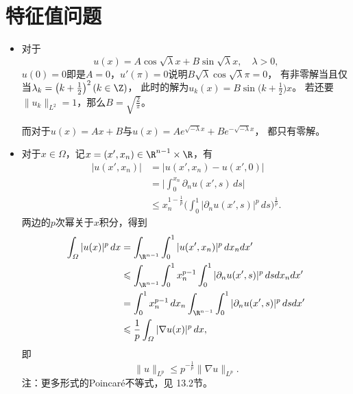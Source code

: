 \section{特征值问题}
\begin{itemize}
    \item[1.]
    对于\[u(x)=A\cos\sqrt{\lambda}x+B\sin\sqrt{\lambda}x,\quad\lambda>0,\]
    $u(0)=0$即是$A=0$，$u'(\pi)=0$说明$B\sqrt{\lambda}\cos\sqrt{\lambda}\pi=0$，
    有非零解当且仅当$\lambda_k=\big(k+\frac12\big)^2\,(k\in\Z)$，
    此时的解为$u_k(x)=B\sin\big(k+\frac12\big)x$。
    若还要$\|u_k\|_{L^2}=1$，那么$B=\sqrt{\frac2\pi}$。

    而对于$u(x)=Ax+B$与$u(x)=Ae^{\sqrt{-\lambda}x}+Be^{-\sqrt{-\lambda}x}$，
    都只有零解。

    \item[2.]
    对于$x\in\varOmega$，记$x=(x',x_n)\in\R^{n-1}\times\R$，有
    \begin{align*}
        |u(x',x_n)|&=|u(x',x_n)-u(x',0)|\\
        &=\bigg|\int_0^{x_n}\partial_nu(x',s)\,ds\bigg|\\
        &\leqslant x_n^{1-\frac{1}{p}}\bigg(\int_0^1|\partial_nu(x',s)|^p\,ds\bigg)^\frac{1}{p}.
    \end{align*}
    两边的$p$次幂关于$x$积分，得到
    \begin{align*}
        \int_\varOmega|u(x)|^p\,dx&=\int_{\R^{n-1}}\int_0^1|u(x',x_n)|^p\,dx_ndx'\\
        &\leqslant\int_{\R^{n-1}}\int_0^1x_n^{p-1}\int_0^1|\partial_nu(x',s)|^p\,dsdx_ndx'\\
        &=\int_0^1x_n^{p-1}\,dx_n\int_{\R^{n-1}}\int_0^1|\partial_nu(x',s)|^p\,dsdx'\\
        &\leqslant\frac{1}{p}\int_\varOmega|\nabla u(x)|^p\,dx,
    \end{align*}
    即
    \[\|u\|_{L^p}\leqslant p^{-\frac{1}{p}}\|\nabla u\|_{L^p}.\]
    注：更多形式的Poincaré不等式，见\cite{Le} 13.2节。


\end{itemize}
